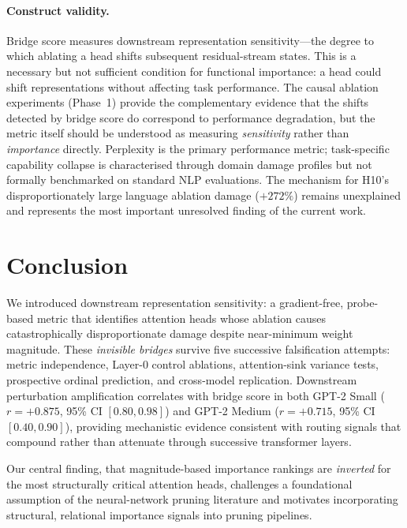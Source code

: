 \documentclass[11pt,a4paper]{article}
\theoremstyle{definition}
\theoremstyle{plain}
\begin{document}
\paragraph{Construct validity.}
Bridge score measures downstream representation sensitivity---the degree
to which ablating a head shifts subsequent residual-stream states.
This is a necessary but not sufficient condition for functional importance:
a head could shift representations without affecting task performance.
The causal ablation experiments (Phase~1) provide the complementary
evidence that the shifts detected by bridge score do correspond to
performance degradation, but the metric itself should be understood as
measuring \emph{sensitivity} rather than \emph{importance} directly.
Perplexity is the primary performance metric; task-specific capability
collapse is characterised through domain damage profiles but not
formally benchmarked on standard NLP evaluations.
The mechanism for H10's disproportionately large language ablation damage
($+272\%$) remains unexplained and represents the most important
unresolved finding of the current work.

\section{Conclusion}
\label{sec:conclusion}

We introduced downstream representation sensitivity: a gradient-free,
probe-based metric that identifies attention heads whose ablation causes
catastrophically disproportionate damage despite near-minimum weight
magnitude.
These \emph{invisible bridges} survive five successive falsification
attempts: metric independence, Layer-0 control ablations, attention-sink
variance tests, prospective ordinal prediction, and cross-model replication.
Downstream perturbation amplification correlates with bridge score
in both GPT-2 Small ($r=+0.875$, 95\% CI $[0.80, 0.98]$) and
GPT-2 Medium ($r=+0.715$, 95\% CI $[0.40, 0.90]$), providing
mechanistic evidence consistent with routing signals that compound rather
than attenuate through successive transformer layers.

Our central finding, that magnitude-based importance rankings are
\emph{inverted} for the most structurally critical attention heads,
challenges a foundational assumption of the neural-network pruning
literature and motivates incorporating structural, relational importance
signals into pruning pipelines.
\end{document}
